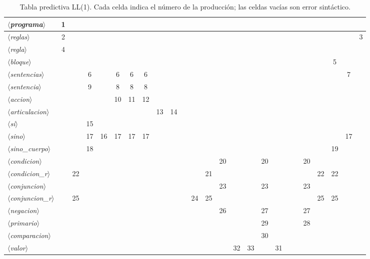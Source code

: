 \documentclass[10pt,a4paper]{article}
\newcommand{\nt}[1]{\ensuremath{\langle}\textit{#1}\ensuremath{\rangle}}   %
\begin{document}
\begin{table}[H]
\begin{adjustbox}{max width=\linewidth, max totalheight=0.8\textheight}
\begin{tabular}{|l|c|c|c|c|c|c|c|c|c|c|c|c|c|c|c|c|c|c|c|c|c|c|c|c|}
\nt{programa} & 1 &  &  &  &  &  &  &  &  &  &  &  &  &  &  &  &  &  &  &  &  &  &  &  \\ \hline
\nt{reglas} & 2 &  &  &  &  &  &  &  &  &  &  &  &  &  &  &  &  &  &  &  &  &  &  & 3 \\ \hline
\nt{regla} & 4 &  &  &  &  &  &  &  &  &  &  &  &  &  &  &  &  &  &  &  &  &  &  &  \\ \hline
\nt{bloque} &  &  &  &  &  &  &  &  &  &  &  &  &  &  &  &  &  &  &  &  &  & 5 &  &  \\ \hline
\nt{sentencias} &  &  & 6 &  & 6 & 6 & 6 &  &  &  &  &  &  &  &  &  &  &  &  &  &  &  & 7 &  \\ \hline
\nt{sentencia} &  &  & 9 &  & 8 & 8 & 8 &  &  &  &  &  &  &  &  &  &  &  &  &  &  &  &  &  \\ \hline
\nt{accion} &  &  &  &  & 10 & 11 & 12 &  &  &  &  &  &  &  &  &  &  &  &  &  &  &  &  &  \\ \hline
\nt{articulacion} &  &  &  &  &  &  &  & 13 & 14 &  &  &  &  &  &  &  &  &  &  &  &  &  &  &  \\ \hline
\nt{si} &  &  & 15 &  &  &  &  &  &  &  &  &  &  &  &  &  &  &  &  &  &  &  &  &  \\ \hline
\nt{sino} &  &  & 17 & 16 & 17 & 17 & 17 &  &  &  &  &  &  &  &  &  &  &  &  &  &  &  & 17 &  \\ \hline
\nt{sino\_cuerpo} &  &  & 18 &  &  &  &  &  &  &  &  &  &  &  &  &  &  &  &  &  &  & 19 &  &  \\ \hline
\nt{condicion} &  &  &  &  &  &  &  &  &  &  &  &  & 20 &  &  & 20 &  &  &  & 20 &  &  &  &  \\ \hline
\nt{condicion\_r} &  & 22 &  &  &  &  &  &  &  &  &  & 21 &  &  &  &  &  &  &  &  & 22 & 22 &  &  \\ \hline
\nt{conjuncion} &  &  &  &  &  &  &  &  &  &  &  &  & 23 &  &  & 23 &  &  &  & 23 &  &  &  &  \\ \hline
\nt{conjuncion\_r} &  & 25 &  &  &  &  &  &  &  &  & 24 & 25 &  &  &  &  &  &  &  &  & 25 & 25 &  &  \\ \hline
\nt{negacion} &  &  &  &  &  &  &  &  &  &  &  &  & 26 &  &  & 27 &  &  &  & 27 &  &  &  &  \\ \hline
\nt{primario} &  &  &  &  &  &  &  &  &  &  &  &  &  &  &  & 29 &  &  &  & 28 &  &  &  &  \\ \hline
\nt{comparacion} &  &  &  &  &  &  &  &  &  &  &  &  &  &  &  & 30 &  &  &  &  &  &  &  &  \\ \hline
\nt{valor} &  &  &  &  &  &  &  &  &  &  &  &  &  & 32 & 33 &  & 31 &  &  &  &  &  &  &  \\ \hline
\end{tabular}
\end{adjustbox}
\caption{Tabla predictiva LL(1). Cada celda indica el número de la producción; las celdas vacías son error sintáctico.}
\label{tab:matriz}
\end{table}
\end{document}
